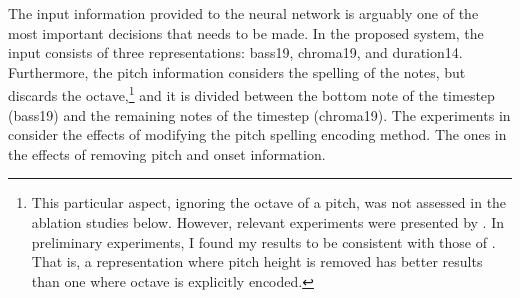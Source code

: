 
The input information provided to the neural network is
arguably one of the most important decisions that needs to
be made. In the proposed system, the input consists of three
representations: \gls{bass19}, \gls{chroma19}, and
\gls{duration14}. Furthermore, the pitch information
considers the spelling of the notes, but discards the
octave,\footnote{This particular aspect, ignoring the octave
of a pitch, was not assessed in the ablation studies below.
However, relevant experiments were presented by
\textcite{micchi2020not}. In preliminary experiments, I
found my results to be consistent with those of
\textcite{micchi2020not}. That is, a representation where
pitch height is removed has better results than one where
octave is explicitly encoded.} and it is divided between the
bottom note of the timestep (\gls{bass19}) and the remaining
notes of the timestep (\gls{chroma19}). The experiments in
 consider the
effects of modifying the pitch spelling encoding method. The
ones in  the effects of
removing pitch and onset information.
